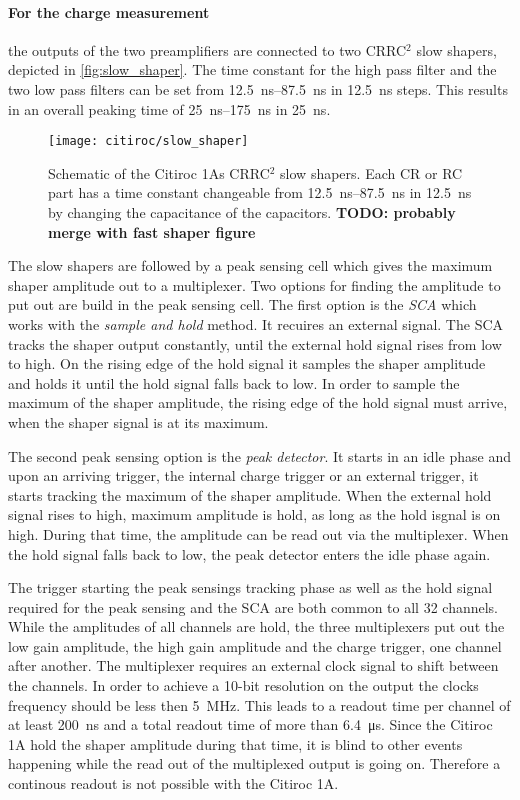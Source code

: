 \paragraph{For the charge measurement} the outputs of the two preamplifiers are connected to two CRRC$^2$ slow shapers, depicted in \autoref{fig:slow_shaper}.
The time constant for the high pass filter and the two low pass filters can be set from \SIrange{12.5}{87.5}{\nano\second} in \SI{12.5}{\nano\second} steps.
This results in an overall peaking time of \SIrange{25}{175}{\nano\second} in \SI{25}{\nano\second}.
\begin{figure}
	\centering
	\texttt{[image: citiroc/slow\_shaper]}
	\caption[Citiroc 1A slow shaper schematic]{Schematic of the Citiroc 1As CRRC$^2$ slow shapers. Each CR or RC part has a time constant changeable from \SIrange{12.5}{87.5}{\nano\second} in \SI{12.5}{\nano\second} by changing the capacitance of the capacitors. \textbf{TODO: probably merge with fast shaper figure}\cite{citiroc}}
	\label{fig:slow_shaper}
\end{figure}
The slow shapers are followed by a peak sensing cell which gives the maximum shaper amplitude out to a multiplexer.
Two options for finding the amplitude to put out are build in the peak sensing cell.
The first option is the \textit{SCA} which works with the \textit{sample and hold} method.
It recuires an external  signal.
The SCA tracks the shaper output constantly, until the external hold signal rises from low to high.
On the rising edge of the hold signal it samples the shaper amplitude and holds it until the hold signal falls back to low.
In order to sample the maximum of the shaper amplitude, the rising edge of the hold signal must arrive, when the shaper signal is at its maximum. 


The second peak sensing option is the \textit{peak detector}.
It starts in an idle phase and upon an arriving trigger, the internal charge trigger or an external trigger, it starts tracking the maximum of the shaper amplitude.
When the external hold signal rises to high, maximum amplitude is hold, as long as the hold isgnal is on high.
During that time, the amplitude can be read out via the multiplexer.
When the hold signal falls back to low, the peak detector enters the idle phase again.

The trigger starting the peak sensings tracking phase as well as the hold signal required for the peak sensing and the SCA are both common to all 32 channels.
While the amplitudes of all channels are hold, the three multiplexers put out the low gain amplitude, the high gain amplitude and the charge trigger, one channel after another.
The multiplexer requires an external clock signal to shift between the channels. 
In order to achieve a 10-bit resolution on the output the clocks frequency should be less then \SI{5}{\mega\hertz}.
This leads to a readout time per channel of at least \SI{200}{\nano\second} and a total readout time of more than \SI{6.4}{\micro\second}.
Since the Citiroc 1A hold the shaper amplitude during that time, it is blind to other events happening while the read out of the multiplexed output is going on.
Therefore a continous readout is not possible with the Citiroc 1A.


